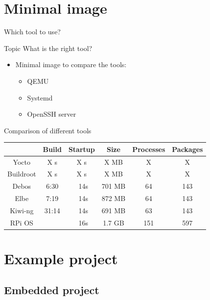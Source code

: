 \documentclass{beamer}
\begin{document}
\section{Minimal image}

\begin{frame}{Which tool to use?}
	\begin{block}{Topic}
		What is the right tool?
	\end{block}

	\begin{itemize}
		\item Minimal image to compare the tools:
		\begin{itemize}
			\item QEMU
			\item Systemd 
			\item OpenSSH server
		\end{itemize}
	\end{itemize}
\end{frame}

\begin{frame}{Comparison of different tools}
	\begin{tabular}{c|ccccc}
		& \textbf{Build} & \textbf{Startup} & \textbf{Size} & \textbf{Processes} & \textbf{Packages} \\
		\hline
		Yocto & X s & X s & X MB & X & X \\ 
		Buildroot & X s & X s & X MB & X & X \\
		\hline
		Debos & 6:30 & ~14s & 701 MB & 64 & 143 \\
		Elbe & 7:19 & ~14s & 872 MB & 64 & 143 \\
		Kiwi-ng & 31:14 & ~14s & 691 MB & 63 & 143 \\
		\hline
		RPi OS & & ~16s & 1.7 GB & 151 & 597 \\
	\end{tabular}
\end{frame}


\section{Example project}

\subsection{Embedded project}

\end{document}
